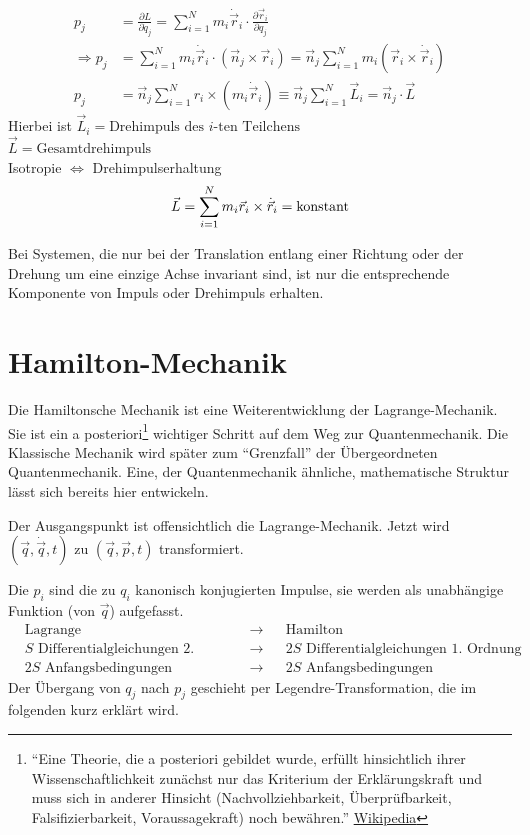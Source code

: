 \begin{align*}
	p_j &= \frac{\partial L}{\partial \dot q_j} = \sum\limits_{i=1}^Nm_i \dot {\vec r}_i \cdot \frac{\partial \vec r_i}{\partial q_j}\\
	\Rightarrow p_j &= \sum\limits_{i=1}^N m_i \dot {\vec r}_i \cdot (\vec n_j \times \vec r_i) = \vec n_j \sum\limits_{i=1}^N m_i (\vec r_i \times \dot {\vec r}_i)\\
	p_j &= \vec n_j \sum\limits_{i=1}^N r_i \times (m_i\dot{\vec r}_i) \equiv \vec n_j \sum\limits_{i=1}^N \vec L_i = \vec n_j \cdot \vec L
\end{align*}
Hierbei ist
$\vec L_i = \text{Drehimpuls des $i$-ten Teilchens}$\\
$\vec L = \text{Gesamtdrehimpuls}$\\
Isotropie  $\Leftrightarrow$ Drehimpulserhaltung
\[\vec L = \sum\limits_{i=1}^Nm_i \vec r_i \times \dot{\vec{r}}_i = \text{konstant} \]
\begin{bemerkung*}
	Bei Systemen, die nur bei der Translation entlang einer Richtung oder der Drehung um eine einzige Achse invariant sind, ist nur die entsprechende Komponente von Impuls oder Drehimpuls erhalten.
\end{bemerkung*}

\section{Hamilton-Mechanik}
Die Hamiltonsche Mechanik ist eine Weiterentwicklung der Lagrange-Mechanik. Sie ist ein a posteriori\footnote{"`Eine Theorie, die a posteriori gebildet wurde, erfüllt hinsichtlich ihrer Wissenschaftlichkeit zunächst nur das Kriterium der Erklärungskraft und muss sich in anderer Hinsicht (Nachvollziehbarkeit, Überprüfbarkeit, Falsifizierbarkeit, Voraussagekraft) noch bewähren."' \href{https://de.wikipedia.org/wiki/A_posteriori}{Wikipedia}} wichtiger Schritt auf dem Weg zur Quantenmechanik. Die Klassische Mechanik wird später zum "`Grenzfall"' der Übergeordneten Quantenmechanik. Eine, der Quantenmechanik ähnliche, mathematische Struktur lässt sich bereits hier entwickeln.

Der Ausgangspunkt ist offensichtlich die Lagrange-Mechanik. Jetzt wird $(\vec q, \dot {\vec q}, t)$ zu $(\vec q, \vec p, t)$ transformiert.

Die $p_i$ sind die zu $q_i$ kanonisch konjugierten Impulse, sie werden als unabhängige Funktion (von $\vec q$) aufgefasst.
\begin{align*}
&\text{Lagrange} &\to& &\text{Hamilton}\\
&\text{$S$ Differentialgleichungen 2. Ordnung} &\to& &\text{$2S$ Differentialgleichungen 1. Ordnung}\\
&\text{$2S$ Anfangsbedingungen} &\to& &\text{$2S$ Anfangsbedingungen}
\end{align*}
Der Übergang von $q_j$ nach $p_j$ geschieht per Legendre-Transformation, die im folgenden kurz erklärt wird.
